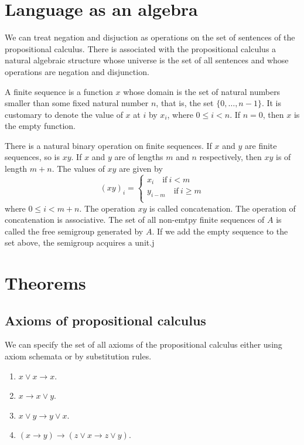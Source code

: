 \documentclass[letterpaper, 10pt]{article}
\theoremstyle{definition}
\newcommand{\set}[1]{\{#1\}}
\renewcommand{\implies}{\rightarrow}
\begin{document}
\section{Language as an algebra}

We can treat negation and disjuction as operations on the set of sentences of
the propositional calculus. There is associated with the propositional calculus
a natural algebraic structure whose universe is the set of all sentences and
whose operations are negation and disjunction.

A finite sequence is a function $x$ whose domain is the set of natural numbers
smaller than some fixed natural number $n$, that is, the set
$\set{0,\ldots,n-1}$. It is customary to denote the value of $x$ at $i$ by
$x_i$, where $0 \leq i < n$. If $n = 0$, then $x$ is the empty function.

There is a natural binary operation on finite sequences. If $x$ and $y$ are
finite sequences, so is $xy$. If $x$ and $y$ are of lengths $m$ and $n$
respectively, then $xy$ is of length $m + n$. The values of $xy$ are given by
\[
	(xy)_i=
	\begin{cases}
		x_i\quad\textrm{if}\ i < m \\
		y_{i - m}\quad\textrm{if}\ i \geq m \\
	\end{cases}
\]
where $0 \leq i < m + n$. The operation $xy$ is called concatenation. The
operation of concatenation is associative. The set of all non-emtpy finite
sequences of $A$ is called the free semigroup generated by $A$. If we add the
empty sequence to the set above, the semigroup acquires a unit.j


\section{Theorems}

\subsection{Axioms of propositional calculus}

We can specify the set of all axioms of the propositional calculus either using
axiom schemata or by substitution rules.

\begin{enumerate}[label=T\arabic*, left=0pt]
	\item $x \lor x \implies x$.
	\item $x \implies x \lor y$.
	\item $x \lor y \implies y \lor x$.
	\item $(x \implies y) \implies (z\lor x \implies z \lor y)$.
\end{enumerate}
\end{document}
